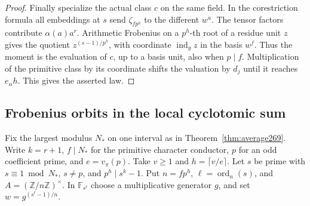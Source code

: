 \documentclass[a4paper,11pt]{article}
\theoremstyle{definition}
\theoremstyle{remark}
\numberwithin{equation}{section}
\begin{document}
\begin{proof}
Finally specialize the actual class \(c\) on the same field.
In the corestriction formula all embeddings at \(s\) send
\(\zeta_{fp^h}\) to the different \(w^a\). The tensor factors
contribute \(\alpha(a)a^r\). Arithmetic Frobenius on a
\(p^h\)-th root of a residue unit \(z\) gives the quotient
\(z^{(s-1)/p^h}\), with coordinate \(\operatorname{ind}_g z\)
in the basis \(w^f\). Thus the moment is the evaluation of
\(c\), up to a basis unit, also when \(p\mid f\).
Multiplication of the primitive class by its coordinate
shifts the valuation by \(d_j\) until it reaches \(e_\alpha h\).
This gives the asserted law.
\end{proof}

\subsection{Frobenius orbits in the local cyclotomic sum}\label{nav:II-56}
Fix the largest modulus \(N_*\) on one interval as in
Theorem~\ref{thm:average269}. Write \(k=r+1\), \(f\mid N_*\)
for the primitive character conductor, \(p\) for an odd coefficient
prime, and \(e=v_\pi(p)\). Take \(v\ge1\) and \(h=\lceil v/e\rceil\).
Let \(s\) be prime with \(s\equiv1\bmod N_*\), \(s\ne p\), and
\(p^h\mid s^k-1\). Put \(n=fp^h\), \(\ell=\operatorname{ord}_n(s)\),
and \(A=(\mathbb Z/n\mathbb Z)^\times\). In \(\mathbb F_{s^\ell}\)
choose a multiplicative generator \(g\), and set
\(w=g^{(s^\ell-1)/n}\).
\end{document}
